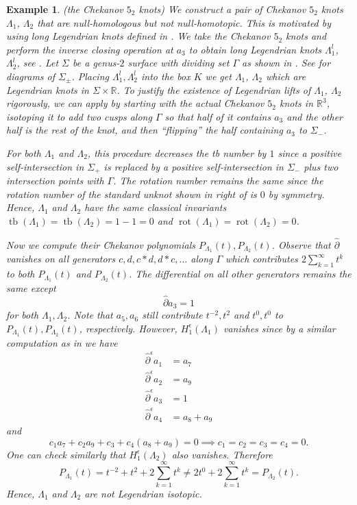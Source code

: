 \documentclass[11pt]{amsart}
\theoremstyle{mystyle}
\newtheorem{example}[example]{Example}
\newcommand{\R}{\mathbb{R}}
\newcommand{\<}{\langle}
\renewcommand{\>}{\rangle}
\DeclareMathOperator{\rot}{\text{rot}}
\DeclareMathOperator{\tb}{tb}
\begin{document}
\begin{example}(the Chekanov $5_2$ knots)
	We construct a pair of Chekanov $5_2$ knots $\Lambda_1$, $\Lambda_2$ that are null-homologous but not null-homotopic. This is motivated by \cite[Sec. 5.2]{licata2013seifert} using long Legendrian knots defined in \cite[Sec. 12]{chekanov2002dga}. We take the Chekanov $5_2$ knots and perform the inverse closing operation at $a_3$ to obtain long Legendrian knots $\Lambda_1^l$, $\Lambda_2^l$, see . Let $\Sigma$ be a genus-$2$ surface with dividing set $\Gamma$ as shown in  . See  for diagrams of $\Sigma_\pm$. Placing $\Lambda_1^l, \Lambda_2^l$ into the box $K$ we get $\Lambda_1$, $\Lambda_2$ which are Legendrian knots in $\Sigma \times \R$. To justify the existence of Legendrian lifts of $\Lambda_1$, $\Lambda_2$ rigorously, we can apply  by starting with the actual Chekanov $5_2$ knots in $\R^3$, isotoping it to add two cusps along $\Gamma$ so that half of it contains $a_3$ and the other half is the rest of the knot, and then ``flipping'' the half containing $a_3$ to $\Sigma_-$.
    
    For both $\Lambda_1$ and $\Lambda_2$, this procedure decreases the tb number by $1$ since a positive self-intersection in $\Sigma_+$ is replaced by a positive self-intersection in $\Sigma_-$ plus two intersection points with $\Gamma$. The rotation number remains the same since the rotation number of the standard unknot shown in right of  is $0$ by symmetry. Hence, $\Lambda_1$ and $\Lambda_2$ have the same classical invariants $\tb(\Lambda_1) = \tb(\Lambda_2) = 1 - 1 = 0$ and $\rot(\Lambda_1) = \rot(\Lambda_2) = 0$.
    
    Now we compute their Chekanov polynomials $P_{\Lambda_1}(t), P_{\Lambda_2}(t)$. Observe that $\widehat{\partial}$ vanishes on all generators $c, d, c*d, d*c, \dots $ along $\Gamma$ which contributes $2 \sum_{k = 1}^\infty t^k$ to both $P_{\Lambda_1}(t)$ and $P_{\Lambda_2}(t)$. The differential on all other generators remains the same except \[\widehat{\partial} a_3 = 1\] for both $\Lambda_1, \Lambda_2$. Note that $a_5, a_6$ still contribute $t^{-2}, t^2$ and $t^0, t^0$ to $P_{\Lambda_1}(t), P_{\Lambda_2}(t)$, respectively. However, $H_1^\epsilon(\Lambda_1)$ vanishes since by a similar computation as in \cite{chekanov2002dga} we have \begin{align*}
        \widehat{\partial}^\epsilon a_1 &= a_7 \\
        \widehat{\partial}^\epsilon a_2 &= a_9 \\
        \widehat{\partial}^\epsilon a_3 &= 1 \\
        \widehat{\partial}^\epsilon a_4 &= a_8 + a_9
    \end{align*} and \[c_1 a_7 + c_2 a_9 + c_3 + c_4(a_8 + a_9) = 0 \implies c_1 = c_2 = c_3 = c_4 = 0.\] One can check similarly that $H_1^\epsilon(\Lambda_2)$ also vanishes. Therefore \[P_{\Lambda_1}(t) = t^{-2} + t^2 + 2 \sum_{k = 1}^\infty t^k \neq 2t^0 + 2 \sum_{k = 1}^\infty t^k = P_{\Lambda_2}(t).\] Hence, $\Lambda_1$ and $\Lambda_2$ are not Legendrian isotopic. 
\end{example}
\end{document}
